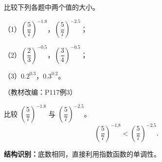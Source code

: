 \begin{frame}[t,label=A10q]
  比较下列各题中两个值的大小。
  \par\vspace{0.2cm}
  （1）$\left(\dfrac57\right)^{-1.8}$，$\left(\dfrac57\right)^{-2.5}$；
  \par\vspace{0.2cm}
  （2）$\left(\dfrac23\right)^{-0.5}$，$\left(\dfrac34\right)^{-0.5}$；
  \par\vspace{0.2cm}
  （3）$0.2^{0.3}$，$0.3^{0.2}$。
  \par\vspace{0.2cm}（教材改编：P117例3）
  \pause
\end{frame}

\begin{frame}[t,label=A10a1]
  比较 $\left(\dfrac57\right)^{-1.8}$ 与 $\left(\dfrac57\right)^{-2.5}$。
  \pause
  \[
    \boxed{\left(\frac57\right)^{-1.8}<\left(\frac57\right)^{-2.5}.}
  \]
  \par\vspace{0.3cm}
  \textbf{结构识别：}底数相同，直接利用指数函数的单调性。
\end{frame}

